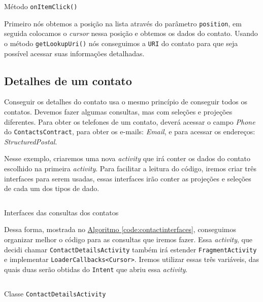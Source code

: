 \documentclass[a4paper,12pt,brazil,oneside]{book}
\begin{document}
\begin{singlespace}
		\begin{listing}[H]
		\inputminted[linenos=true,fontsize=\small,frame=lines, framesep=2mm, tabsize=2,numbersep=5pt]{java}{src/api/contacts/onitemclick.java}
		\caption{Método \texttt{onItemClick()}}
		\label{code:contactonitemclick}
		\end{listing} 	
			
	Primeiro nós obtemos a posição na lista através do parâmetro \texttt{position}, em seguida colocamos o \emph{cursor} nessa posição e obtemos os dados do contato. Usando o método \texttt{getLookupUri()} nós conseguimos a \texttt{URI} do contato para que seja possível acessar suas informações detalhadas.

	\subsection{Detalhes de um contato}

	Conseguir os detalhes do contato usa o mesmo princípio de conseguir todos os contatos. Devemos fazer algumas consultas, mas com seleções e projeções diferentes. Para obter os telefones de um contato, deverá acessar o campo \emph{Phone} do \texttt{ContactsContract}, para obter os e-mails: \emph{Email}, e para acessar os endereços: \emph{StructuredPostal}.

	Nesse exemplo, criaremos uma nova \emph{activity} que irá conter os dados do contato escolhido na primeira \emph{activity}. Para facilitar a leitura do código, iremos criar três interfaces para serem usadas, essas interfaces irão conter as projeções e seleções de cada um dos tipos de dado. 

		\begin{listing}[H]
		\inputminted[linenos=true,fontsize=\small,frame=lines, framesep=2mm, tabsize=2,numbersep=5pt]{java}{src/api/contacts/interfaces.java}
		\caption{Interfaces das consultas dos contatos}
		\label{code:contactinterfaces}
		\end{listing} 	

	Dessa forma, mostrada no \hyperref[code:contactinterfaces]{Algoritmo \ref*{code:contactinterfaces}}, conseguimos organizar melhor o código para as consultas que iremos fazer. Essa \emph{activity}, que decidi chamar \texttt{ContactDetailsActivity} também irá estender \texttt{FragmentActivity} e implementar \texttt{LoaderCallbacks<Cursor>}. Iremos utilizar essas três variáveis, das quais duas serão obtidas do \texttt{Intent} que abriu essa \emph{activity}.
	
		\begin{listing}[H]
		\inputminted[linenos=true,fontsize=\small,frame=lines, framesep=2mm, tabsize=2,numbersep=5pt]{java}{src/api/contacts/contactdetails.java}
		\caption{Classe \texttt{ContactDetailsActivity}}
		\label{code:contactdetailsactivity}
		\end{listing} 	



\end{singlespace}
\end{document}
